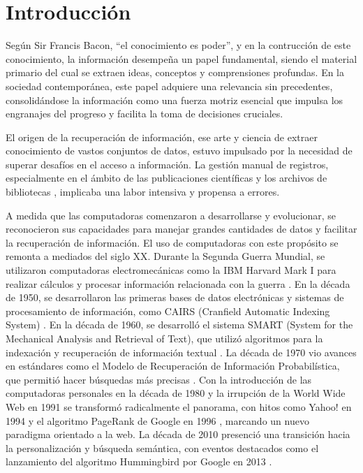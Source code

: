 \chapter*{Introducción}\label{chapter:introduction}

Seg\'un Sir Francis Bacon, ``el conocimiento es poder'', y en la contrucci\'on de este conocimiento, la información desempeña un papel fundamental, siendo el material primario del cual se extraen ideas, conceptos y comprensiones profundas. En la sociedad contemporánea, este papel adquiere una relevancia sin precedentes, consolidándose la información como una fuerza motriz esencial que impulsa los engranajes del progreso y facilita la toma de decisiones cruciales.

El origen de la recuperación de información, ese arte y ciencia de extraer conocimiento de vastos conjuntos de datos, estuvo impulsado por la necesidad de superar desafíos en el acceso a información. La gestión manual de registros, especialmente en el ámbito de las publicaciones científicas y los archivos de bibliotecas , implicaba una labor intensiva y propensa a errores.

A medida que las computadoras comenzaron a desarrollarse y evolucionar, se reconocieron sus capacidades para manejar grandes cantidades de datos y facilitar la recuperación de información. El uso de computadoras con este prop\'osito se remonta a mediados del siglo XX. Durante la Segunda Guerra Mundial, se utilizaron computadoras electromecánicas como la IBM Harvard Mark I para realizar cálculos y procesar información relacionada con la guerra . En la década de 1950, se desarrollaron las primeras bases de datos electrónicas y sistemas de procesamiento de información, como CAIRS (Cranfield Automatic Indexing System) . En la década de 1960, se desarrolló el sistema SMART (System for the Mechanical Analysis and Retrieval of Text), que utilizó algoritmos para la indexación y recuperación de información textual . La década de 1970 vio avances en estándares como el Modelo de Recuperación de Información Probabilística, que permiti\'o hacer b\'usquedas m\'as precisas . Con la introducción de las computadoras personales en la década de 1980  y la irrupción de la World Wide Web en 1991  se transformó radicalmente el panorama, con hitos como Yahoo! en 1994  y el algoritmo PageRank de Google en 1996 , marcando un nuevo paradigma orientado a la web. La década de 2010 presenció una transición hacia la personalización y búsqueda semántica, con eventos destacados como el lanzamiento del algoritmo Hummingbird por Google en 2013 . 

